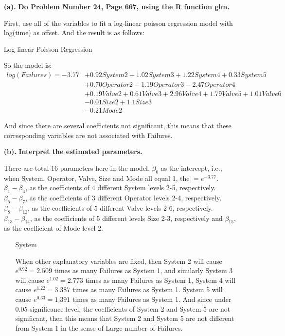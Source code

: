 \documentclass[10pt,letterpaper]{article}
\begin{document}
\begin{enumerate}[leftmargin=0cm,itemindent=.5cm,labelwidth=\itemindent,labelsep=0cm,align=left]
\item[\textbf{(a).} ] \textbf{Do Problem Number 24, Page 667, using the R function glm.}

First, use all of the variables to fit a log-linear poisson regression model with log(time) as offset. And the result is as follows:
\begin{center}
Log-linear Poisson Regression 
\end{center}
So the model is:
\begin{equation*}
\begin{split}
log(Failures) = -3.77 & + 0.92System2+1.02System3+1.22System4+0.33System5\\
& + 0.70Operator2-1.19Operator3-2.47Operator4\\
& + 0.19Valve2+0.61Valve3+2.96Valve4+1.79Valve5+1.01Valve6\\
& - 0.01Size2+1.1Size3\\
& - 0.21Mode2
\end{split}
\end{equation*}


And since there are several coefficients not significant, this means that these corresponding variables are not associated with Failures. \\

\item[\textbf{(b).} ] \textbf{Interpret the estimated parameters.}

There are total 16 parameters here in the model. $\beta_0$ as the intercept, i.e., when System, Operator, Valve, Size and Mode all equal 1, the $ =e^{-3.77}$. $\beta_1-\beta_4$, as the coefficients of 4 different System levels 2-5, respectively. $\beta_5-\beta_7$, as the coefficients of 3 different Operator levels 2-4, respectively. $\beta_8-\beta_{12}$, as the coefficients of 5 different Valve levels 2-6, respectively. $\beta_{13}-\beta_{14}$, as the coefficients of 5 different levels Size 2-3, respectively and $\beta_{15}$, as the coefficient of Mode level 2.
\begin{enumerate}[leftmargin=0cm,itemindent=.5cm,labelwidth=\itemindent,labelsep=0cm,align=left]
\item[\textbullet] System

When other explanatory variables are fixed, then System 2 will cause $e^{0.92}=2.509$ times as many Failures as System 1, and similarly System 3 will cause $e^{1.02}=2.773$ times as many Failures as System 1, System 4 will cause $e^{1.22}=3.387$ times as many Failures as System 1. System 5 will cause $e^{0.33}=1.391$ times as many Failures as System 1. And since under 0.05 significance level, the coefficients of System 2 and System 5 are not significant, then this means that System 2 and System 5 are not different from System 1 in the sense of Large number of Failures.


\end{enumerate}
\end{enumerate}
\end{document}
